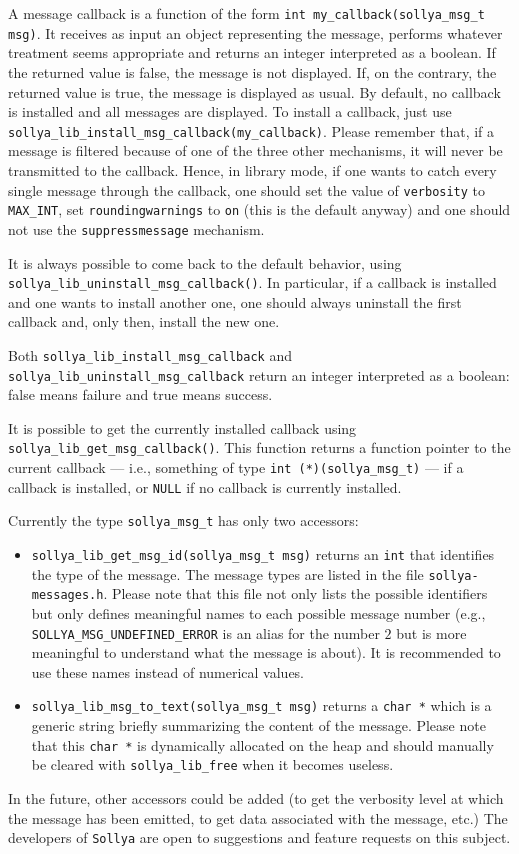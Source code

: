 \documentclass[a4paper]{article}
\newcommand{\sollya}{\texttt{Sollya}\xspace}
\begin{document}
A message callback is a function of the form \verb|int my_callback(sollya_msg_t msg)|. It receives as input an object representing the message, performs whatever treatment seems appropriate and returns an integer interpreted as a boolean. If the returned value is false, the message is not displayed. If, on the contrary, the returned value is true, the message is displayed as usual. By default, no callback is installed and all messages are displayed. To install a callback, just use \verb|sollya_lib_install_msg_callback(my_callback)|. Please remember that, if a message is filtered because of one of the three other mechanisms, it will never be transmitted to the callback. Hence, in library mode, if one wants to catch every single message through the callback, one should set the value of \verb|verbosity| to \verb|MAX_INT|, set \verb|roundingwarnings| to \verb|on| (this is the default anyway) and one should not use the \verb|suppressmessage| mechanism.

It is always possible to come back to the default behavior, using \verb|sollya_lib_uninstall_msg_callback()|. In particular, if a callback is installed and one wants to install another one, one should always uninstall the first callback and, only then, install the new one.

Both \verb|sollya_lib_install_msg_callback| and \verb|sollya_lib_uninstall_msg_callback| return an integer interpreted as a boolean: false means failure and true means success.

It is possible to get the currently installed callback using \verb|sollya_lib_get_msg_callback()|. This function returns a function pointer to the current callback --- i.e., something of type \verb|int (*)(sollya_msg_t)| --- if a callback is installed, or \verb|NULL| if no callback is currently installed.

Currently the type \verb|sollya_msg_t| has only two accessors:
\begin{itemize}
\item \verb|sollya_lib_get_msg_id(sollya_msg_t msg)| returns an \verb|int| that identifies the type of the message. The message types are listed in the file \verb|sollya-messages.h|. Please note that this file not only lists the possible identifiers but only defines meaningful names to each possible message number (e.g., \verb|SOLLYA_MSG_UNDEFINED_ERROR| is an alias for the number $2$ but is more meaningful to understand what the message is about). It is recommended to use these names instead of numerical values.
\item \verb|sollya_lib_msg_to_text(sollya_msg_t msg)| returns a \verb|char *| which is a generic string briefly summarizing the content of the message. Please note that this \verb|char *| is dynamically allocated on the heap and should manually be cleared with \verb|sollya_lib_free| when it becomes useless.
\end{itemize}
In the future, other accessors could be added (to get the verbosity level at which the message has been emitted, to get data associated with the message, etc.) The developers of \sollya are open to suggestions and feature requests on this subject.
\end{document}
